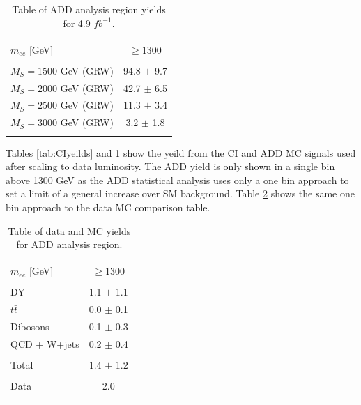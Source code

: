 \begin{table}[h!]
\centering %
\begin{tabular}{l c} %
\hline\hline \\[-2ex] %
$m_{ee}$ [GeV] & $\geq 1300$ \\  [0.2ex]
\hline  \\[-2ex] %
$M_{S} = 1500$ GeV (GRW) & 94.8 $\pm$ 9.7 \\ 
$M_{S} = 2000$ GeV (GRW) & 42.7 $\pm$ 6.5 \\ 
$M_{S} = 2500$ GeV (GRW) & 11.3 $\pm$ 3.4 \\ 
$M_{S} = 3000$ GeV (GRW) & 3.2 $\pm$ 1.8 \\ 
\hline\hline  \\ %
\end{tabular}
\caption{Table of ADD analysis region yields for 4.9 $fb^{-1}$.} %
\label{tab:ADDyeilds}
\end{table}


Tables \ref{tab:CIyeilds} and \ref{tab:ADDyeilds} show the yeild from the CI and ADD MC signals used after scaling to data luminosity. The ADD yield is only shown in a single bin above 1300 GeV as the ADD statistical analysis uses only a one bin approach to set a limit of a general increase over SM background. Table \ref{tab:dataMCADDyeilds} shows the same one bin approach to the data MC comparison table.

\begin{table}[h!]
\centering %
\begin{tabular}{l c} %
\hline\hline \\[-2ex] %
$m_{ee}$ [GeV] & $\geq 1300$ \\  [0.2ex]
\hline  \\[-2ex] %
DY & 1.1 $\pm$ 1.1 \\ 
$t\bar{t}$ & 0.0 $\pm$ 0.1 \\ 
Dibosons & 0.1 $\pm$ 0.3 \\ 
QCD + W+jets & 0.2 $\pm$ 0.4 \\ 
\hline  \\[-2ex] %
Total & 1.4 $\pm$ 1.2 \\ 
\hline  \\[-2ex] %
Data & 2.0 \\ 
\hline\hline  \\ %
\end{tabular}
\caption{Table of data and MC yields for ADD analysis region.} %
\label{tab:dataMCADDyeilds}
\end{table}


